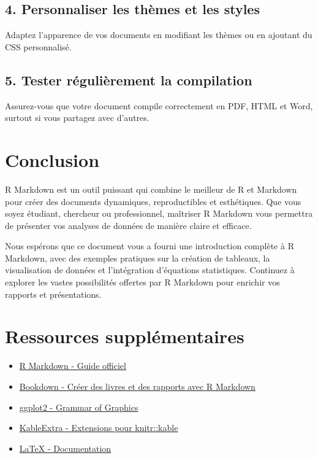 \documentclass[
]{article}
\providecommand{\tightlist}{%
  \setlength{\itemsep}{0pt}\setlength{\parskip}{0pt}}
\begin{document}
\hypertarget{personnaliser-les-thuxe8mes-et-les-styles}{%
\subsection{4. Personnaliser les thèmes et les
styles}\label{personnaliser-les-thuxe8mes-et-les-styles}}

Adaptez l'apparence de vos documents en modifiant les thèmes ou en
ajoutant du CSS personnalisé.

\hypertarget{tester-ruxe9guliuxe8rement-la-compilation}{%
\subsection{5. Tester régulièrement la
compilation}\label{tester-ruxe9guliuxe8rement-la-compilation}}

Assurez-vous que votre document compile correctement en PDF, HTML et
Word, surtout si vous partagez avec d'autres.

\hypertarget{conclusion}{%
\section{Conclusion}\label{conclusion}}

R Markdown est un outil puissant qui combine le meilleur de R et
Markdown pour créer des documents dynamiques, reproductibles et
esthétiques. Que vous soyez étudiant, chercheur ou professionnel,
maîtriser R Markdown vous permettra de présenter vos analyses de données
de manière claire et efficace.

Nous espérons que ce document vous a fourni une introduction complète à
R Markdown, avec des exemples pratiques sur la création de tableaux, la
visualisation de données et l'intégration d'équations statistiques.
Continuez à explorer les vastes possibilités offertes par R Markdown
pour enrichir vos rapports et présentations.

\hypertarget{ressources-suppluxe9mentaires}{%
\section{Ressources
supplémentaires}\label{ressources-suppluxe9mentaires}}

\begin{itemize}
\tightlist
\item
  \href{https://rmarkdown.rstudio.com/}{R Markdown - Guide officiel}
\item
  \href{https://bookdown.org/}{Bookdown - Créer des livres et des
  rapports avec R Markdown}
\item
  \href{https://ggplot2.tidyverse.org/}{ggplot2 - Grammar of Graphics}
\item
  \href{https://haozhu233.github.io/kableExtra/}{KableExtra - Extensions
  pour knitr::kable}
\item
  \href{https://www.latex-project.org/help/documentation/}{LaTeX -
  Documentation}
\end{itemize}
\end{document}
